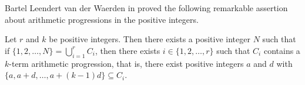 \documentclass[letterpaper, 12pt, oneside, showtrims, draft]{memoir}
\theoremstyle{plain}
\begin{document}
\addtolength{\baselineskip}{1.7pt}
\pagestyle{plain}















% 
% 
% 
% 
% 


Bartel Leendert van der Waerden in \cite{Van-der-Waerden:1927fk} proved the following remarkable assertion about arithmetic progressions in the positive integers.


  Let $r$ and $k$ be positive integers.
  Then there exists a positive integer $N$ such that if $\{1, 2, \ldots, N\} = \bigcup_{i=1}^r C_i$, then there exists $i \in \{1, 2, \ldots, r\}$ such that $C_i$ contains a $k$-term arithmetic progression, that is, there exist positive integers $a$ and $d$ with $\{a, a+d, \ldots, a + (k-1)d\} \subseteq C_i$.
\end{document}
